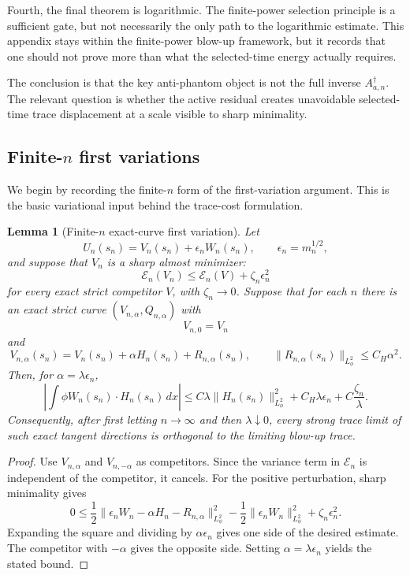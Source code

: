 \documentclass[11pt]{article}
\numberwithin{equation}{section}
\theoremstyle{plain}
\newtheorem{lemma}{Lemma}[section]
\theoremstyle{definition}
\theoremstyle{remark}
\begin{document}
Fourth, the final theorem is logarithmic.  The finite-power selection principle is a sufficient gate, but not necessarily the only path to the logarithmic estimate.  This appendix stays within the finite-power blow-up framework, but it records that one should not prove more than what the selected-time energy actually requires.

The conclusion is that the key anti-phantom object is not the full inverse
\(A_{a,n}^\dagger\).  The relevant question is whether the active residual creates unavoidable selected-time trace displacement at a scale visible to sharp minimality.

\subsection{Finite-\texorpdfstring{\(n\)}{n} first variations}
\label{pV:sec:finite-n-first-variations}

We begin by recording the finite-\(n\) form of the first-variation argument.  This is the
basic variational input behind the trace-cost formulation.

\begin{lemma}[Finite-\(n\) exact-curve first variation]
\label{pV:lem:finite-n-exact-curve-first-variation}
Let
\[
        U_n(s_n)=V_n(s_n)+\epsilon_n W_n(s_n),
        \qquad
        \epsilon_n=m_n^{1/2},
\]
and suppose that \(V_n\) is a sharp almost minimizer:
\[
        \mathcal E_n(V_n)
        \le
        \mathcal E_n(V)+\zeta_n\epsilon_n^2
\]
for every exact strict competitor \(V\), with \(\zeta_n\to0\).  Suppose that for each \(n\)
there is an exact strict curve \((V_{n,\alpha},Q_{n,\alpha})\) with
\[
        V_{n,0}=V_n
\]
and
\[
        V_{n,\alpha}(s_n)
        =V_n(s_n)+\alpha H_n(s_n)+R_{n,\alpha}(s_n),
        \qquad
        \|R_{n,\alpha}(s_n)\|_{L^2_\phi}\le C_H\alpha^2 .
\]
Then, for \(\alpha=\lambda\epsilon_n\),
\[
        \left|\int \phi W_n(s_n)\cdot H_n(s_n)\,dx\right|
        \le
        C\lambda\|H_n(s_n)\|_{L^2_\phi}^2
        +C_H\lambda\epsilon_n
        +C\frac{\zeta_n}{\lambda}.
\]
Consequently, after first letting \(n\to\infty\) and then \(\lambda\downarrow0\), every strong
trace limit of such exact tangent directions is orthogonal to the limiting blow-up trace.
\end{lemma}

\begin{proof}
Use \(V_{n,\alpha}\) and \(V_{n,-\alpha}\) as competitors.  Since the variance term in
\(\mathcal E_n\) is independent of the competitor, it cancels.  For the positive perturbation,
sharp minimality gives
\[
        0\le
        \frac12\|\epsilon_n W_n-\alpha H_n-R_{n,\alpha}\|_{L^2_\phi}^2
        -\frac12\|\epsilon_n W_n\|_{L^2_\phi}^2
        +\zeta_n\epsilon_n^2 .
\]
Expanding the square and dividing by \(\alpha\epsilon_n\) gives one side of the desired
estimate.  The competitor with \(-\alpha\) gives the opposite side.  Setting
\(\alpha=\lambda\epsilon_n\) yields the stated bound.
\end{proof}
\end{document}
